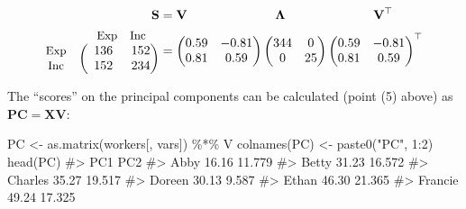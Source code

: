 \documentclass[
  letterpaper,
  10pt,
  krantz2]{krantz}
\makeatletter
\newenvironment{Shaded}{\begin{snugshade}}{\end{snugshade}}
\newcommand{\CommentTok}[1]{\textcolor[rgb]{0.37,0.37,0.37}{#1}}
\newcommand{\DecValTok}[1]{\textcolor[rgb]{0.68,0.00,0.00}{#1}}
\newcommand{\FunctionTok}[1]{\textcolor[rgb]{0.28,0.35,0.67}{#1}}
\newcommand{\NormalTok}[1]{\textcolor[rgb]{0.00,0.23,0.31}{#1}}
\newcommand{\OtherTok}[1]{\textcolor[rgb]{0.00,0.23,0.31}{#1}}
\newcommand{\SpecialCharTok}[1]{\textcolor[rgb]{0.37,0.37,0.37}{#1}}
\newcommand{\StringTok}[1]{\textcolor[rgb]{0.13,0.47,0.30}{#1}}
\newenvironment{kframe}{%
  \medskip{}
  \setlength{\fboxsep}{.8em}
  \def\at@end@of@kframe{}%
  \ifinner\ifhmode%
  \def\at@end@of@kframe{\end{minipage}}%
  \begin{minipage}{\columnwidth}%
  \fi\fi%
  \def\FrameCommand##1{\hskip\@totalleftmargin \hskip-\fboxsep
  \colorbox{shadecolor}{##1}\hskip-\fboxsep
      \hskip-\linewidth \hskip-\@totalleftmargin \hskip\columnwidth}%
  \MakeFramed {\advance\hsize-\width
    \@totalleftmargin\z@ \linewidth\hsize
    \@setminipage}}%
{\par\unskip\endMakeFramed%
  \at@end@of@kframe}
\renewenvironment{Shaded}{\begin{kframe}}{\end{kframe}}
\makeatother
\begin{document}
\[
\begin{align*}
\mathbf{S} & = \mathbf{V}\phantom{00000000000000}\mathbf{\Lambda}\phantom{00000000000000}\mathbf{V}^\top \\ 
\begin{matrix}
  &  \begin{matrix} \phantom{i} \small \text{Exp} & \small \text{Inc}
  \end{matrix} \\ 
 \begin{matrix}  
   \small \text{Exp}\\ 
   \small \text{Inc}\\ 
\end{matrix}  & 
\begin{pmatrix}  
\phantom{e}136 & \phantom{e}152 \\ 
\phantom{e}152 & \phantom{e}234 \\ 
\end{pmatrix}
\\ 
\end{matrix} 
& =\begin{pmatrix} 
 0.59 & -0.81 \\ 
 0.81 &  0.59 \\ 
\end{pmatrix}
  \begin{pmatrix} 
344 &   0 \\ 
  0 &  25 \\ 
\end{pmatrix}
  \begin{pmatrix} 
 0.59 & -0.81 \\ 
 0.81 &  0.59 \\ 
\end{pmatrix}^\top
\end{align*}
\]

The ``scores'' on the principal components can be calculated (point (5)
above) as \(\mathbf{PC} = \mathbf{X} \mathbf{V}\):

\begin{Shaded}
\begin{Highlighting}[]
\NormalTok{PC }\OtherTok{\textless{}{-}} \FunctionTok{as.matrix}\NormalTok{(workers[, vars]) }\SpecialCharTok{\%*\%}\NormalTok{ V}
\FunctionTok{colnames}\NormalTok{(PC) }\OtherTok{\textless{}{-}} \FunctionTok{paste0}\NormalTok{(}\StringTok{"PC"}\NormalTok{, }\DecValTok{1}\SpecialCharTok{:}\DecValTok{2}\NormalTok{)}
\FunctionTok{head}\NormalTok{(PC)}
\CommentTok{\#\textgreater{}           PC1    PC2}
\CommentTok{\#\textgreater{} Abby    16.16 11.779}
\CommentTok{\#\textgreater{} Betty   31.23 16.572}
\CommentTok{\#\textgreater{} Charles 35.27 19.517}
\CommentTok{\#\textgreater{} Doreen  30.13  9.587}
\CommentTok{\#\textgreater{} Ethan   46.30 21.365}
\CommentTok{\#\textgreater{} Francie 49.24 17.325}
\end{Highlighting}
\end{Shaded}
\end{document}
